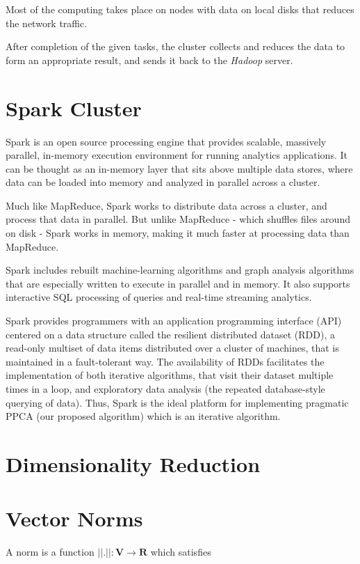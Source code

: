 \documentclass[12pt,notitlepage,oneside]{report}
\begin{document}
Most of the computing takes place on nodes with data on local disks that reduces the network traffic.

After completion of the given tasks, the cluster collects and reduces the data to form an appropriate result, and sends it back to the \textit{Hadoop} server.

\section{Spark Cluster}
Spark \cite{spark} is an open source processing engine that provides scalable, massively parallel, in-memory execution environment for running analytics applications. It can be thought as an in-memory layer that sits above multiple data stores, where data can be loaded into memory and analyzed in parallel across a cluster.

Much like MapReduce, Spark works to distribute data across a cluster, and process that data in parallel. But unlike MapReduce - which shuffles files around on disk - Spark works in memory, making it much faster at processing data than MapReduce.

Spark includes rebuilt machine-learning algorithms and graph analysis algorithms that are especially written to execute in parallel and in memory. It also supports interactive SQL processing of queries and real-time streaming analytics.

Spark provides programmers with an application programming interface (API) centered on a data structure called the resilient distributed dataset (RDD), a read-only multiset of data items distributed over a cluster of machines, that is maintained in a fault-tolerant way. The availability of RDDs facilitates the implementation of both iterative algorithms, that visit their dataset multiple times in a loop, and exploratory data analysis (the repeated database-style querying of data). Thus, Spark is the ideal platform for implementing pragmatic PPCA (our proposed algorithm) which is an iterative algorithm.


\section{Dimensionality Reduction}

\section{Vector Norms}
A norm is a function $\pmb{||.||: V\rightarrow R}$ which satisfies
\end{document}
